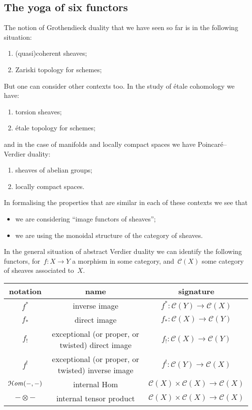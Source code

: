 \documentclass[10pt,a4paper]{article}
\begin{document}
\subsection{The yoga of six functors}
\label{subsection:six-functors-yoga}
The notion of Grothendieck duality that we have seen so far is in the following situation:
\begin{enumerate}
  \item (quasi)coherent sheaves;
  \item Zariski topology for schemes;
\end{enumerate}
But one can consider other contexts too. In the study of \'etale cohomology we have:
\begin{enumerate}
  \item torsion sheaves;
  \item \'etale topology for schemes;
\end{enumerate}
and in the case of manifolds and locally compact spaces we have Poincar\'e--Verdier duality:
\begin{enumerate}
  \item sheaves of abelian groups;
  \item locally compact spaces.
\end{enumerate}

In formalising the properties that are similar in each of these contexts we see that
\begin{itemize}
  \item we are considering ``image functors of sheaves'';
  \item we are using the monoidal structure of the category of sheaves.
\end{itemize}
In the general situation of abstract Verdier duality we can identify the following functors, for~$f\colon X\to Y$ a morphism in some category, and~$\mathcal{C}(X)$ some category of sheaves associated to~$X$.

\begin{center}
  \begin{tabular}{ccc}
    \toprule
    notation & name & signature \\\midrule
    $f^*$ & inverse image & $f^*\colon\mathcal{C}(Y)\to\mathcal{C}(X)$ \\
    $f_*$ & direct image & $f_*\colon\mathcal{C}(X)\to\mathcal{C}(Y)$ \\
    $f_!$ & exceptional (or proper, or twisted) direct image & $f_!\colon\mathcal{C}(X)\to\mathcal{C}(Y)$ \\
    $f^!$ & exceptional (or proper, or twisted) inverse image & $f^!\colon\mathcal{C}(Y)\to\mathcal{C}(X)$ \\
    $\operatorname{\mathcal{H}\mathit{om}}(-,-)$ & internal Hom & $\mathcal{C}(X)\times\mathcal{C}(X)\to\mathcal{C}(X)$ \\
    $-\otimes-$ & internal tensor product & $\mathcal{C}(X)\times\mathcal{C}(X)\to\mathcal{C}(X)$ \\
    \bottomrule
  \end{tabular}
\end{center}
\end{document}
